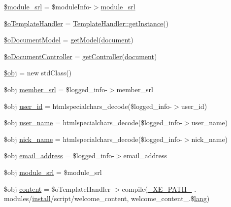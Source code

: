 \begin{DoxyCompactItemize}
\item 
\hyperlink{ko_8install_8php_ae40aed4d7a99050245e66ca2a82949ed}{\$module\+\_\+srl} = \$module\+Info-\/$>$\hyperlink{ko_8install_8php_a370bb6450fab1da3e0ed9f484a38b761}{module\+\_\+srl}
\item 
\hyperlink{ko_8install_8php_abd57e3ab220291ea9b5c16c2a4e0670e}{\$o\+Template\+Handler} = \hyperlink{classTemplateHandler_a9745460c5daccfc48abf8652778b2718}{Template\+Handler\+::get\+Instance}()
\item 
\hyperlink{ko_8install_8php_afb18aa87e5520385e76377e876e042af}{\$o\+Document\+Model} = \hyperlink{func_8inc_8php_aecdfcc5332bcf22df01fc21a03b64435}{get\+Model}(\textquotesingle{}\hyperlink{classdocument}{document}\textquotesingle{})
\item 
\hyperlink{ko_8install_8php_aac43fce682d4b7a05df6d3e44c2c54e6}{\$o\+Document\+Controller} = \hyperlink{func_8inc_8php_aa08f01e3bf130d770b373ca8493e3e9b}{get\+Controller}(\textquotesingle{}\hyperlink{classdocument}{document}\textquotesingle{})
\item 
\hyperlink{ko_8install_8php_a9008ed94ba185855b1723e367744b87e}{\$obj} = new std\+Class()
\item 
\$obj \hyperlink{ko_8install_8php_aa61f9e08f0fe505094d26f8143f30bbd}{member\+\_\+srl} = \$logged\+\_\+info-\/$>$member\+\_\+srl
\item 
\$obj \hyperlink{ko_8install_8php_a74f1a394389d774e5b4cd5d1d15413f7}{user\+\_\+id} = htmlspecialchars\+\_\+decode(\$logged\+\_\+info-\/$>$user\+\_\+id)
\item 
\$obj \hyperlink{ko_8install_8php_a115401aff7da80e73c66e9f76505426b}{user\+\_\+name} = htmlspecialchars\+\_\+decode(\$logged\+\_\+info-\/$>$user\+\_\+name)
\item 
\$obj \hyperlink{ko_8install_8php_a151ecae87a1f3d7e257aa089803086bd}{nick\+\_\+name} = htmlspecialchars\+\_\+decode(\$logged\+\_\+info-\/$>$nick\+\_\+name)
\item 
\$obj \hyperlink{ko_8install_8php_a1dffea0d5ba8194f8ef01f414af0c831}{email\+\_\+address} = \$logged\+\_\+info-\/$>$email\+\_\+address
\item 
\$obj \hyperlink{ko_8install_8php_a370bb6450fab1da3e0ed9f484a38b761}{module\+\_\+srl} = \$module\+\_\+srl
\item 
\$obj \hyperlink{ko_8install_8php_a65dddc3e5e47cb506e6b5417ffb3bdef}{content} = \$o\+Template\+Handler-\/$>$compile(\hyperlink{config_8inc_8php_a5387c7a3f2aa38adf16f324cee88db88}{\+\_\+\+X\+E\+\_\+\+P\+A\+T\+H\+\_\+} . \textquotesingle{}modules/\hyperlink{classinstall}{install}/script/welcome\+\_\+content\textquotesingle{}, \textquotesingle{}welcome\+\_\+content\+\_\+\textquotesingle{}.\$\hyperlink{xe_8min_8js_a23a891e84296aaa19cd3c5a3fc2146ec}{lang})

\end{DoxyCompactItemize}
